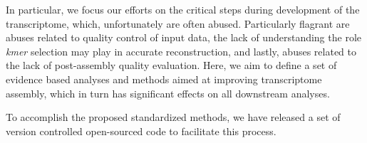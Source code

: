 In particular, we focus our efforts on the critical steps during development of the transcriptome, which, unfortunately are often abused. Particularly flagrant are abuses related to quality control of input data, the lack of understanding the role \textit{kmer} selection may play in accurate reconstruction, and lastly, abuses related to the lack of post-assembly quality evaluation. Here, we aim to define a set of evidence based analyses and methods aimed at improving transcriptome assembly, which in turn has significant effects on all downstream analyses. 


To accomplish the proposed standardized methods, we have released a set of version controlled open-sourced code to facilitate this process.   
